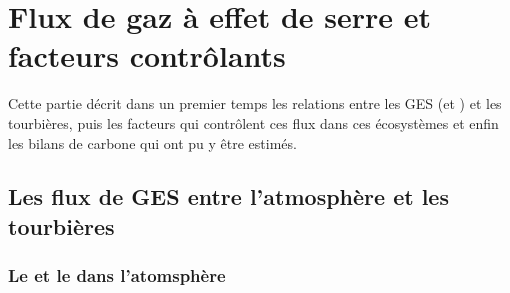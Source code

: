 \section{Flux de gaz à effet de serre et facteurs contrôlants}
\doublespacing


Cette partie décrit dans un premier temps les relations entre les GES (\coo et \chh) et les tourbières, puis les facteurs qui contrôlent ces flux dans ces écosystèmes et enfin les bilans de carbone qui ont pu y être estimés.

\subsection{Les flux de GES entre l'atmosphère et les tourbières}
\subsubsection{Le \coo et le \chh dans l'atomsphère}

